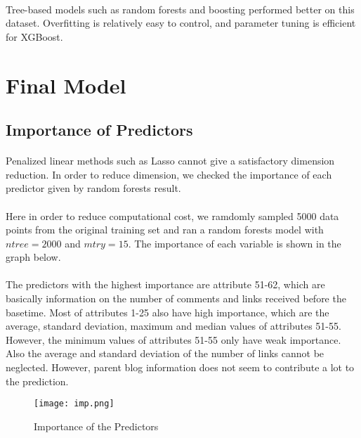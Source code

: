 \documentclass[paper=a4, fontsize=11pt]{scrartcl} %
\numberwithin{equation}{section} %
\numberwithin{figure}{section} %
\numberwithin{table}{section} %
\begin{document}
\paragraph{}
Tree-based models such as random forests and boosting performed better on this dataset. Overfitting is relatively easy to control, and parameter tuning is efficient for XGBoost.

%
%
\section{Final Model}
\subsection{Importance of Predictors}
\paragraph{}
Penalized linear methods such as Lasso cannot give a satisfactory dimension reduction. In order to reduce dimension, we checked the importance of each predictor given by random forests result. 
\paragraph{}
Here in order to reduce computational cost, we ramdomly sampled 5000 data points from the original training set and ran a random forests model with \(ntree = 2000\) and \(mtry = 15\). The importance of each variable is shown in the graph below.
\paragraph{}
The predictors with the highest importance are attribute 51-62, which are basically information on the number of comments and links received before the basetime. Most of attributes 1-25 also have high importance, which are the average, standard deviation, maximum and median values of attributes 51-55. However, the minimum values of attributes 51-55 only have weak importance. Also the average and standard deviation of the number of links cannot be neglected. However, parent blog information does not seem to contribute a lot to the prediction.

\begin{figure}[H]
    \centering
        \texttt{[image: imp.png]} 
        \caption{Importance of the Predictors}
\end{figure}
\end{document}

